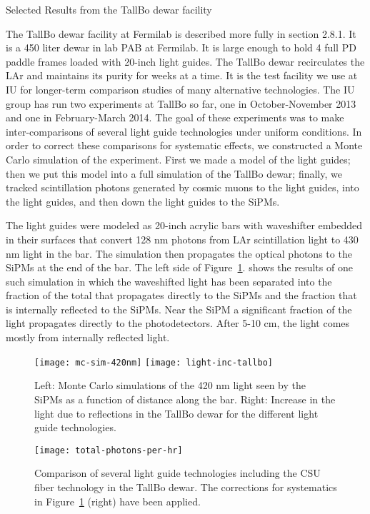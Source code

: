 Selected Results from the TallBo dewar facility

The TallBo dewar facility at Fermilab is described more fully in section 2.8.1.  It is a 450 liter dewar in lab PAB at Fermilab.  It is large enough to hold 4 full PD paddle frames loaded with 20-inch light guides.  The TallBo dewar recirculates the LAr and maintains its purity for weeks at a time.  It is the test facility we use at IU for longer-term comparison  studies of many alternative technologies.  
The IU group has run two experiments at TallBo so far, one in October-November 2013 and one in February-March 2014.  The goal of these experiments was to make inter-comparisons of several light guide technologies under uniform conditions.  In order to correct these comparisons for systematic effects, we constructed a Monte Carlo simulation of the experiment.  First we made a model of the light guides; then we put this model into a full simulation of the TallBo dewar; finally, we tracked scintillation photons generated by cosmic muons to the light guides, into the light guides, and then down the light guides to the SiPMs.  

The light guides were modeled as 20-inch acrylic bars with waveshifter embedded in their surfaces that convert 128 nm photons from LAr scintillation light to 430 nm light in the bar.  The simulation then propagates the optical photons to the SiPMs at the end of the bar.   The left side of Figure~\ref{fig:mc-sim-and-tallbo}. shows the results of one such simulation in which the waveshifted light has been separated into the fraction of the total that propagates directly to the SiPMs and the fraction that is internally reflected to the SiPMs.  Near the SiPM a significant fraction of the light propagates directly to the photodetectors.   After 5-10 cm, the light comes mostly from internally reflected light.  

\begin{figure}[htbp]
\centering
\texttt{[image: mc-sim-420nm]}
\texttt{[image: light-inc-tallbo]}
\caption{Left: Monte Carlo simulations of the 420 nm light seen by the SiPMs as a function of distance along the bar. Right: Increase in the light due to reflections in the TallBo dewar for the different light guide technologies. }
\label{fig:mc-sim-and-tallbo}
\end{figure}

\begin{figure}[htbp]
\centering
\texttt{[image: total-photons-per-hr]}
\caption{Comparison of several light guide technologies including the CSU fiber technology in the TallBo dewar.  The corrections for systematics in Figure~\ref{fig:mc-sim-and-tallbo} (right) have been applied. }
\label{fig:total-photons-per-hr}
\end{figure}


